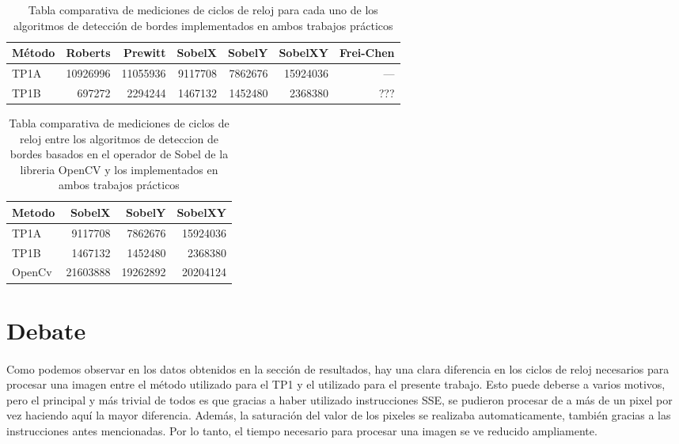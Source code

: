 \documentclass[11pt, a4paper]{article}
\begin{document}
\begin{table}[ht] %
\centering %
\begin{tabular}{|l|r|r|r|r|r|r|}
\hline
M\'etodo & Roberts & Prewitt & SobelX & SobelY & SobelXY & Frei-Chen \\
\hline
TP1A & 10926996 & 11055936 & 9117708 & 7862676 & 15924036 & --- \\
\hline
TP1B & 697272 & 2294244 & 1467132 & 1452480 & 2368380 & ???\\
\hline
\end{tabular}

\caption{Tabla comparativa de mediciones de ciclos de reloj para cada uno de los algoritmos de detecci\'on de bordes implementados en ambos trabajos pr\'acticos} %
\label{Tiempo metodos} %
\end{table}
\vspace{30pt}

\begin{table}[ht] %
\centering %
\begin{tabular}{|l|r|r|r|}
\hline
Metodo & SobelX & SobelY & SobelXY \\
\hline
TP1A & 9117708 & 7862676 & 15924036 \\
\hline
TP1B & 1467132 & 1452480 & 2368380 \\
\hline
OpenCv & 21603888 & 19262892 & 20204124 \\
\hline



\end{tabular}

\caption{Tabla comparativa de mediciones de ciclos de reloj entre los algoritmos de deteccion de bordes basados en el operador de Sobel de la libreria OpenCV y los implementados en ambos trabajos pr\'acticos} %
\label{Tiempo comparacion} %
\end{table}


\newpage
\section{Debate}
\paragraph{}
Como podemos observar en los datos obtenidos en la secci\'on de resultados, hay una clara diferencia en los ciclos de reloj necesarios para procesar una imagen entre el m\'etodo utilizado para el TP1 y el utilizado para el presente trabajo. Esto puede deberse a varios motivos, pero el principal y m\'as trivial de todos es que gracias a haber utilizado instrucciones SSE, se pudieron procesar de a m\'as de un pixel por vez haciendo aqu\'i la mayor diferencia. Adem\'as, la saturaci\'on del valor de los pixeles se realizaba automaticamente, tambi\'en gracias a las instrucciones antes mencionadas. Por lo tanto, el tiempo necesario para procesar una imagen se ve reducido ampliamente.
\end{document}
